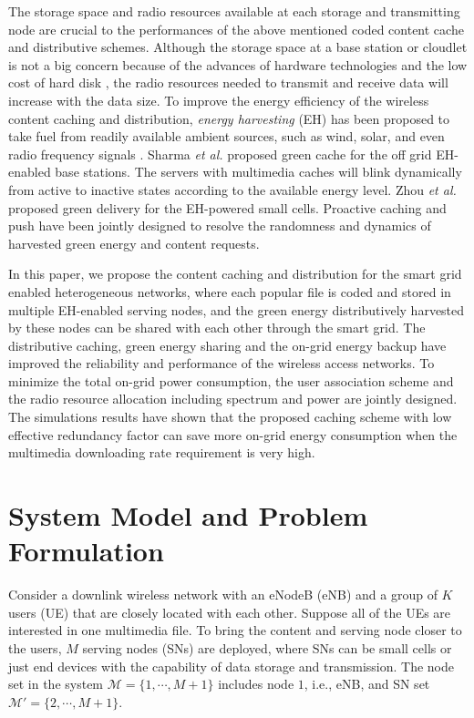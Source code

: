 \documentclass[journal,12pt,onecolumn]{IEEEtran}
\begin{document}
The storage space and radio resources available at each storage and transmitting node are crucial to the performances of the above mentioned coded content cache and distributive schemes. Although the storage space at a base station or cloudlet is not a big concern because of the advances of hardware technologies and the low cost of hard disk \cite{Chang:2008:BDS:1365815.1365816}, the radio resources needed to transmit and receive data will increase with the data size. To improve the energy efficiency of the wireless content caching and distribution, \emph{energy harvesting} (EH) has been proposed to take fuel from readily available ambient sources, such as wind, solar, and even radio frequency signals \cite{7001217,7143338}. Sharma \emph{et al.} \cite{Sharma:2013:GAO:2483977.2484009} proposed green cache for the off grid EH-enabled base stations. The servers with multimedia caches will blink dynamically from active to inactive states according to the available energy level. Zhou \emph{et al.} \cite{7081087} proposed green delivery for the EH-powered small cells. Proactive caching and push have been jointly designed to resolve the randomness and dynamics of harvested green energy and content requests. 

In this paper, we propose the content caching and distribution for the smart grid enabled heterogeneous networks, where each popular file is coded and stored in multiple EH-enabled serving nodes, and the green energy distributively harvested by these nodes can be shared with each other through the smart grid. The distributive caching, green energy sharing and the on-grid energy backup have improved the reliability and performance of the wireless access networks. To minimize the total on-grid power consumption, the user association scheme and the radio resource allocation including spectrum and power are jointly designed. The simulations results have shown that the proposed caching scheme with low effective redundancy factor can save more on-grid energy consumption when the multimedia downloading rate requirement is very high.



\section{System Model and Problem Formulation}
Consider a downlink wireless network with an eNodeB (eNB) and a group of $K$ users (UE) that are closely located with each other. Suppose all of the UEs are interested in one multimedia file. To bring the content and serving node closer to the users, $M$ serving nodes (SNs) are deployed, where SNs can be small cells or just end devices with the capability of data storage and transmission. The node set in the system $\mathcal{M}=\{1,\cdots,M+1\}$ includes node $1$, i.e., eNB, and SN set $\mathcal{M}'=\{2,\cdots,M+1\}$.
\end{document}
